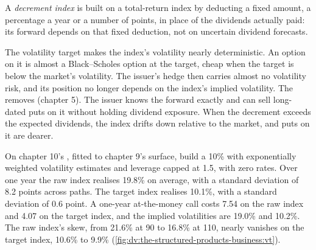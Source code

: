 \begin{definition}\label{def:dv:the-structured-products-business:decrement}
A \emph{decrement index} is built on a total-return index by deducting a fixed amount, a percentage a year or a
number of points, in place of the dividends actually paid: its forward depends on that fixed deduction, not on uncertain dividend
forecasts.
\end{definition}

The volatility target makes the index's volatility nearly deterministic. An option on it is almost a Black--Scholes option at the target,
cheap when the target is below the market's volatility. The issuer's hedge then carries almost no volatility risk, and its 
position no longer depends on the index's implied volatility. The  removes  (chapter 5). The issuer knows
the forward exactly and can sell long-dated puts on it without holding dividend exposure. When the decrement exceeds the expected
dividends, the index drifts down relative to the market, and puts on it are dearer.

\begin{example}\label{ex:dv:the-structured-products-business:vt}
On chapter 10's , fitted to chapter 9's surface, build a 10\%  with exponentially weighted volatility
estimates and leverage capped at 1.5, with zero rates. Over one year the raw index realises 19.8\% on average, with a standard deviation
of 8.2 points across paths. The target index realises 10.1\%, with a standard deviation of 0.6 point. A one-year at-the-money call costs
7.54 on the raw index and 4.07 on the target index, and the implied volatilities are 19.0\% and 10.2\%. The raw index's skew, from 21.6\% at
90 to 16.8\% at 110, nearly vanishes on the target index, 10.6\% to 9.9\% (\cref{fig:dv:the-structured-products-business:vt}).
\end{example}

